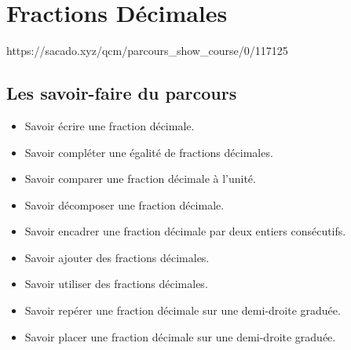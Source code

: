 
\chapter{Fractions Décimales}
{https://sacado.xyz/qcm/parcours_show_course/0/117125}
{


 \begin{CpsCol}
 \section{Les savoir-faire du parcours}
 \begin{itemize}
 \item Savoir écrire une fraction décimale.
 \item Savoir compléter une égalité de fractions décimales.
 \item Savoir comparer une fraction décimale à l'unité.
 \item Savoir décomposer une fraction décimale.
 \item Savoir encadrer une fraction décimale par deux entiers consécutifs.
 \item Savoir ajouter des fractions décimales.
 \item Savoir utiliser des fractions décimales.
 \item Savoir repérer une fraction décimale sur une demi-droite graduée.
 \item Savoir placer une fraction décimale sur une demi-droite graduée.
 \end{itemize}
 \end{CpsCol}
}

